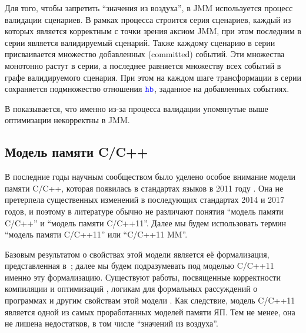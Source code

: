 
Для того, чтобы запретить ``значения из воздуха'', в JMM используется процесс
валидации сценариев.
В рамках процесса строится серия сценариев, каждый из которых является корректным с точки зрения аксиом JMM,
при этом последним в серии является валидируемый сценарий.
Также каждому сценарию в серии присваивается множество добавленных (committed) событий.
Эти множества монотонно растут в серии, а последнее равняется множеству всех событий в графе валидируемого сценария.
При этом на каждом шаге трансформации в серии сохраняется подмножество отношения $\lHB$, заданное на добавленных
событиях.

В \cite{Sevcik-Aspinall:ECOOP08} показывается, что именно из-за процесса валидации упомянутые выше оптимизации
некорректны в JMM.

\subsection{Модель памяти C/C++}
\label{sec:cppmodel}
В последние годы научным сообществом было уделено особое внимание модели памяти C/C++,
которая появилась в стандартах языков в 2011 году \cite{C:11,CPP:11}.
Она не претерпела существенных изменений в последующих стандартах 2014 \cite{CPP:14} и 2017 \cite{CPP:17} годов,
и поэтому в литературе обычно не различают понятия ``модель памяти C/C++'' и ``модель памяти C/C++11''.
Далее мы будем использовать термин ``модель памяти C/C++11'' или ``C/C++11 MM''.

Базовым результатом о свойствах этой модели является её формализация, представленная 
в~\cite{Batty-al:POPL11}; далее
мы будем подразумевать под моделью C/C++11 именно эту формализацию.
Существуют работы, посвященные корректности компиляции и оптимизаций
\cite{Batty-al:POPL12,Vafeiadis-al:POPL15,Chakraborty-Vafeiadis:CGO16,Lahav-al:PLDI17,Batty-al:POPL16},
логикам для формальных рассуждений о программах
\cite{Turon-al:OOPSLA14,Vafeiadis-Narayan:OOPSLA13,Lahav-Vafeiadis:ICALP15,Doko-Vafeiadis:VMCAI16,Vafeiadis:CPP15}
и другим свойствам этой модели
\cite{Batty-al:POPL13,Batty-al:ESOP15,Lidbury-Donaldson:POPL17, Tassarotti-al:PLDI15,Doko-Vafeiadis:ESOP17}.
Как следствие, модель C/C++11 является одной из самых проработанных моделей памяти ЯП.
Тем не менее, она не лишена недостатков, в том числе ``значений из воздуха''.

